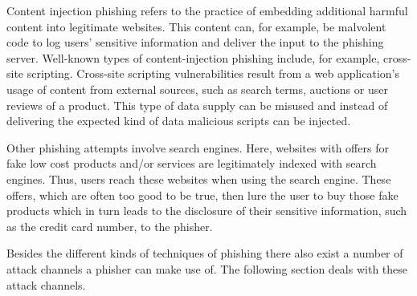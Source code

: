 \begin{description}[leftmargin=0cm]
	\item[Content Injection Phishing] Content injection phishing refers to the practice of embedding additional harmful content into legitimate websites. This content can, for example, be malvolent code to log users' sensitive information and deliver the input to the phishing server. Well-known types of content-injection phishing include, for example, cross-site scripting. Cross-site scripting vulnerabilities result from a web application's usage of content from external sources, such as search terms, auctions or user reviews of a product. This type of data supply can be misused and instead of delivering the expected kind of data malicious scripts can be injected.
	\item[Search Engine Phishing] Other phishing attempts involve search engines. Here, websites with offers for fake low cost products and/or services are legitimately indexed with search engines. Thus, users reach these websites when using the search engine. These offers, which are often too good to be true, then lure the user to buy those fake products which in turn leads to the disclosure of their sensitive information, such as the credit card number, to the phisher.
\end{description}

Besides the different kinds of techniques of phishing there also exist a number of attack channels a phisher can make use of. The following section deals with these attack channels.
